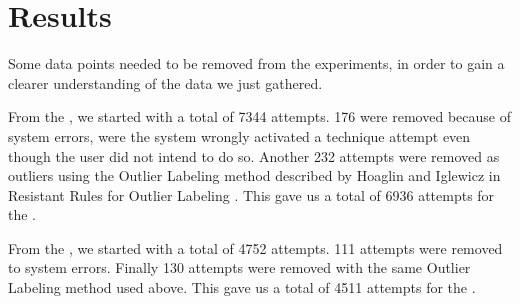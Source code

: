 \section{Results}\label{sec:results}

Some data points needed to be removed from the experiments, in order to gain a clearer understanding of the data we just gathered. 


From the \target, we started with a total of 7344 attempts.
176 were removed because of system errors, were the system wrongly activated a technique attempt even though the user did not intend to do so.
Another 232 attempts were removed as outliers using the Outlier Labeling method described by Hoaglin and Iglewicz in Resistant Rules for Outlier Labeling \cite{Hoaglin:1987}.
This gave us a total of 6936 attempts for the \target.

From the \accuracy, we started with a total of 4752 attempts.
111 attempts were removed to system errors. 
Finally 130 attempts were removed with the same Outlier Labeling method used above.
This gave us a total of 4511 attempts for the \accuracy.


